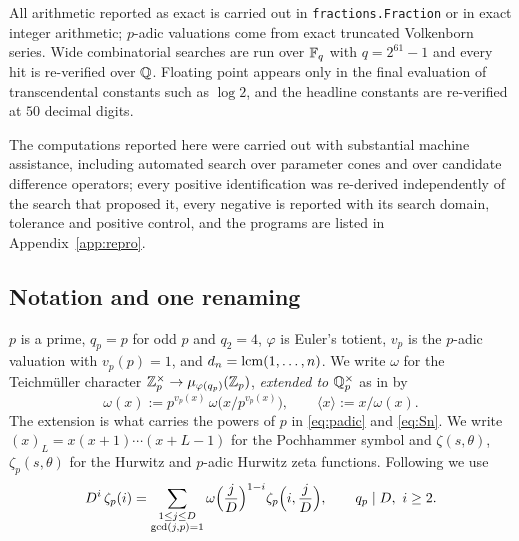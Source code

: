 All arithmetic reported as exact is carried out in \texttt{fractions.Fraction} or in exact
integer arithmetic; $p$-adic valuations come from exact truncated Volkenborn series.
Wide combinatorial searches are run over $\mathbb{F}_q$ with $q=2^{61}-1$ and every hit is
re-verified over $\mathbb{Q}$. Floating point appears only in the final evaluation of
transcendental constants such as $\log2$, and the headline constants are re-verified at
$50$ decimal digits.

\begin{remark}\label{rem:method}
The computations reported here were carried out with substantial machine assistance,
including automated search over parameter cones and over candidate difference operators;
every positive identification was re-derived independently of the search that proposed it,
every negative is reported with its search domain, tolerance and positive control, and the
programs are listed in Appendix~\ref{app:repro}.
\end{remark}

\subsection{Notation and one renaming}\label{ss:notation}

$p$ is a prime, $q_p=p$ for odd $p$ and $q_2=4$, $\varphi$ is Euler's totient, $v_p$ is the
$p$-adic valuation with $v_p(p)=1$, and $d_n=\operatorname{lcm}(1,\dots,n)$. We write $\omega$ for the
Teichm\"uller character $\mathbb{Z}_p^\times\to\mu_{\varphi(q_p)}(\mathbb{Z}_p)$, \emph{extended to}
$\mathbb{Q}_p^\times$ as in \cite[\S2]{LaiSprang2023} by
\begin{equation}\label{eq:omegaext}
 \omega(x):=p^{v_p(x)}\,\omega\bigl(x/p^{v_p(x)}\bigr),\qquad
 \langle x\rangle:=x/\omega(x).
\end{equation}
The extension is what carries the powers of $p$ in \eqref{eq:padic} and \eqref{eq:Sn}. We write $(x)_L=x(x+1)\cdots(x+L-1)$ for the
Pochhammer symbol and $\zeta(s,\theta)$, $\zeta_p(s,\theta)$ for the Hurwitz and $p$-adic
Hurwitz zeta functions. Following \cite[Lemma 12]{LaiSprang2023} we use
\begin{equation}\label{eq:cosetsum}
 D^i\,\zeta_p(i)=\sum_{\substack{1\le j\le D\\ \gcd(j,p)=1}}
   \omega\Bigl(\frac jD\Bigr)^{1-i}\zeta_p\Bigl(i,\frac jD\Bigr),
 \qquad q_p\mid D,\ i\ge2 .
\end{equation}

